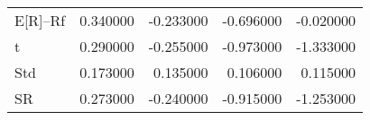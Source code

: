 \begin{tabular}{lrrrr}
\toprule
\midrule
E[R]--Rf & 0.340000 & -0.233000 & -0.696000 & -0.020000 \\
t & 0.290000 & -0.255000 & -0.973000 & -1.333000 \\
Std & 0.173000 & 0.135000 & 0.106000 & 0.115000 \\
SR & 0.273000 & -0.240000 & -0.915000 & -1.253000 \\
\bottomrule
\end{tabular}
